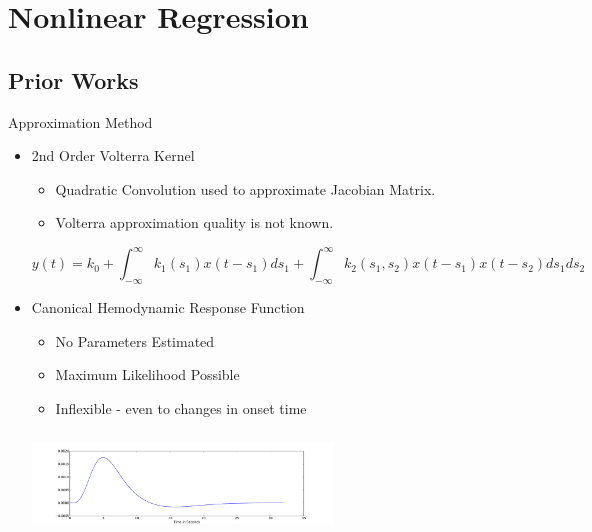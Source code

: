 \documentclass{beamer}
\begin{document}
\section{Nonlinear Regression}
\subsection{Prior Works}
\begin{frame}{Approximation Method}
  \begin{itemize}
    \item 2nd Order Volterra Kernel \cite{Friston2000}
    \begin{itemize}
        \item Quadratic Convolution used to approximate Jacobian Matrix.
        \item Volterra approximation quality is not known.
    \end{itemize}
    {\footnotesize
    $$y(t) = k_0 + \int_{-\infty}^{\infty} k_1(s_1) x(t-s_1) ds_1
        + \int_{-\infty}^{\infty} k_2(s_1,s_2) x(t-s_1)x(t-s_2) ds_1 ds_2$$
    }
    \item Canonical Hemodynamic Response Function
    \begin{itemize}
        \item No Parameters Estimated
        \item Maximum Likelihood Possible
        \item Inflexible - even to changes in onset time
    \end{itemize}
    \begin{center}
    \includegraphics[clip=true,trim=4.88cm 0cm 5cm 1.5cm,height=2.7cm,width=8cm]{HRF}
    \end{center}
    
  \end{itemize}
\end{frame}
\end{document}
